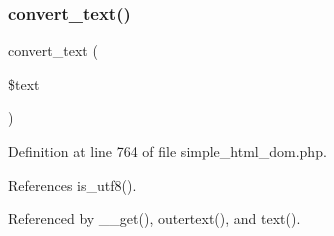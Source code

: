 \subsubsection{\texorpdfstring{convert\+\_\+text()}{convert\_text()}}
{\footnotesize\ttfamily convert\+\_\+text (\begin{DoxyParamCaption}\item[{}]{\$text }\end{DoxyParamCaption})}



Definition at line 764 of file simple\+\_\+html\+\_\+dom.\+php.



References is\+\_\+utf8().



Referenced by \+\_\+\+\_\+get(), outertext(), and text().


